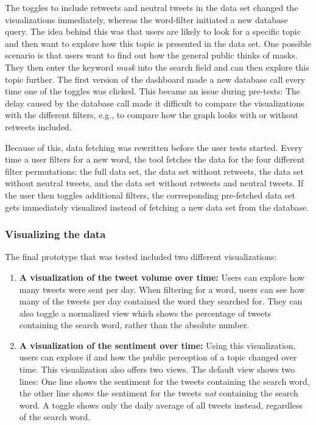 The toggles to include retweets and neutral tweets in the data set changed the visualizations immediately, whereas the word-filter initiated a new database query. The idea behind this was that users are likely to look for a specific topic and then want to explore how this topic is presented in the data set. One possible scenario is that users want to find out how the general public thinks of masks. They then enter the keyword \emph{mask} into the search field and can then explore this topic further. The first version of the dashboard made a new database call every time one of the toggles was clicked. This became an issue during pre-tests: The delay caused by the database call made it difficult to compare the visualizations with the different filters, e.g., to compare how the graph looks with or without retweets included.

Because of this, data fetching was rewritten before the user tests started. Every time a user filters for a new word, the tool fetches the data for the four different filter permutations: the full data set, the data set without retweets, the data set without neutral tweets, and the data set without retweets and neutral tweets. If the user then toggles additional filters, the corresponding pre-fetched data set gets immediately visualized instead of fetching a new data set from the database.

\subsubsection{Visualizing the data}
The final prototype that was tested included two different visualizations:

\begin{enumerate}
    \item \textbf{A visualization of the tweet volume over time:} Users can explore how many tweets were sent per day. When filtering for a word, users can see how many of the tweets per day contained the word they searched for. They can also toggle a normalized view which shows the percentage of tweets containing the search word, rather than the absolute number.
    \item \textbf{A visualization of the sentiment over time:} Using this visualization, users can explore if and how the public perception of a topic changed over time. This visualization also offers two views. The default view shows two lines: One line shows the sentiment for the tweets containing the search word, the other line shows the sentiment for the tweets \emph{not} containing the search word. A toggle shows only the daily average of all tweets instead, regardless of the search word.
\end{enumerate}

